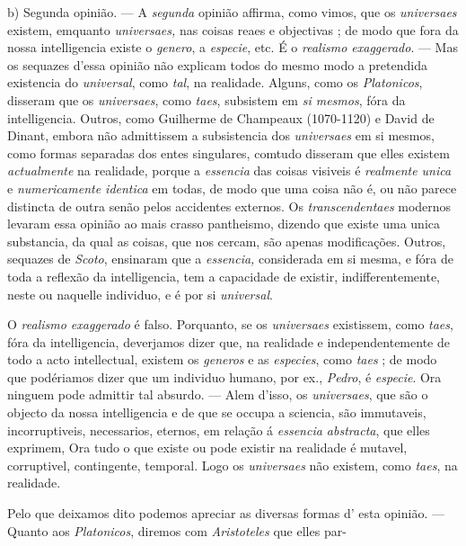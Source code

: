 b) Segunda opinião. --- A \emph{segunda} opinião affirma, como vimos, que os \emph{universaes} existem, emquanto \emph{universaes,} nas coisas reaes e objectivas ; de modo que fora da nossa intelligencia existe o \emph{genero}, a \emph{especie}, etc. É o \emph{realismo exaggerado}. --- Mas os sequazes d'essa opinião não explicam todos do mesmo modo a pretendida existencia do \emph{universal}, como \emph{tal}, na realidade. Alguns, como os \emph{Platonicos}, disseram que os \emph{universaes}, como \emph{taes}, subsistem em \emph{si mesmos}, fóra da intelligencia. Outros, como Guilherme de Champeaux (1070-1120) e David de Dinant, embora não admittissem a subsistencia dos \emph{universaes} em si mesmos, como formas separadas dos entes singulares, comtudo disseram que elles existem \emph{actualmente} na realidade, porque a \emph{essencia} das coisas visiveis é \emph{realmente unica} e \emph{numericamente identica} em todas, de modo que uma coisa não é, ou não parece distincta de outra senão pelos accidentes externos. Os \emph{transcendentaes} modernos levaram essa opinião ao mais crasso pantheismo, dizendo que existe uma unica substancia, da qual as coisas, que nos cercam, são apenas modificações. Outros, sequazes de \emph{Scoto}, ensinaram que a \emph{essencia,} considerada em si mesma, e fóra de toda a reflexão da intelligencia, tem a capacidade de existir, indifferentemente, neste ou naquelle individuo, e é por si \emph{universal}.

O \emph{realismo exaggerado} é falso. Porquanto, se os \emph{universaes} existissem, como \emph{taes}, fóra da intelligencia, deverjamos dizer que, na realidade e independentemente de todo a acto intellectual, existem os \emph{generos} e as \emph{especies}, como \emph{taes} ; de modo que podériamos dizer que um individuo humano, por ex., \emph{Pedro}, é \emph{especie}. Ora ninguem pode admittir tal absurdo. --- Alem d'isso, os \emph{universaes}, que são o objecto da nossa intelligencia e de que se occupa a sciencia, são immutaveis, incorruptiveis, necessarios, eternos, em relação á \emph{essencia abstracta}, que elles exprimem, Ora tudo o que existe ou pode existir na realidade é mutavel, corruptivel, contingente, temporal. Logo os \emph{universaes} não existem, como \emph{taes}, na realidade.

Pelo que deixamos dito podemos apreciar as diversas formas d' esta opinião. --- Quanto aos \emph{Platonicos}, diremos com \emph{Aristoteles} que elles par-

